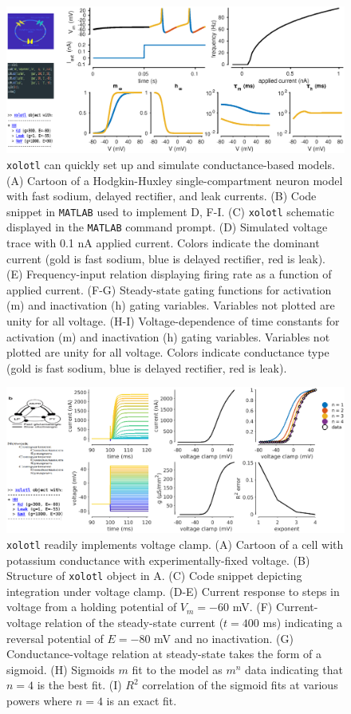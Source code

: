 \documentclass[utf8]{frontiersSCNS} %
\begin{document}
\begin{figure}
	\centering
	\includegraphics[width=1.0\linewidth]{gfx/figure_HH}
	\caption{\texttt{xolotl} can quickly set up and simulate conductance-based models. (A) Cartoon of a Hodgkin-Huxley single-compartment neuron model with fast sodium, delayed rectifier, and leak currents. (B) Code snippet in \texttt{MATLAB} used to implement D, F-I. (C) \texttt{xolotl} schematic displayed in the \texttt{MATLAB} command prompt. (D) Simulated voltage trace with 0.1 nA applied current. Colors indicate the dominant current (gold is fast sodium, blue is delayed rectifier, red is leak). (E) Frequency-input relation displaying firing rate as a function of applied current. (F-G) Steady-state gating functions for activation (m) and inactivation (h) gating variables. Variables not plotted are unity for all voltage. (H-I) Voltage-dependence of time constants for activation (m) and inactivation (h) gating variables. Variables not plotted are unity for all voltage. Colors indicate conductance type (gold is fast sodium, blue is delayed rectifier, red is leak).}
	\label{fig:figurehh}
\end{figure}

\begin{figure}
	\centering
	\includegraphics[width=1.0\linewidth]{gfx/figure_clamp}
	\caption{\texttt{xolotl} readily implements voltage clamp. (A) Cartoon of a cell with potassium conductance with experimentally-fixed voltage. (B) Structure of \texttt{xolotl} object in A. (C) Code snippet depicting integration under voltage clamp. (D-E) Current response to steps in voltage from a holding potential of $V_m = -60$ mV. (F) Current-voltage relation of the steady-state current ($t = 400$ ms) indicating a reversal potential of $E = -80$ mV and no inactivation. (G) Conductance-voltage relation at steady-state takes the form of a sigmoid. (H) Sigmoids $m$ fit to the model as $m^n$ data indicating that $n=4$ is the best fit. (I) $R^2$ correlation of the sigmoid fits at various powers where $n=4$ is an exact fit.}
	\label{fig:figureclamp}
\end{figure}
\end{document}
